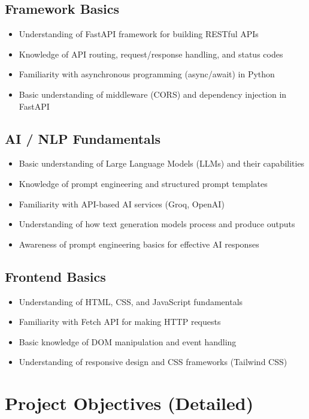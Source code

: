 \documentclass[12pt,a4paper]{article}
\begin{document}
\subsection{Framework Basics}
\begin{itemize}
  \item Understanding of FastAPI framework for building RESTful APIs
  \item Knowledge of API routing, request/response handling, and status codes
  \item Familiarity with asynchronous programming (async/await) in Python
  \item Basic understanding of middleware (CORS) and dependency injection in FastAPI
\end{itemize}

\subsection{AI / NLP Fundamentals}
\begin{itemize}
  \item Basic understanding of Large Language Models (LLMs) and their capabilities
  \item Knowledge of prompt engineering and structured prompt templates
  \item Familiarity with API-based AI services (Groq, OpenAI)
  \item Understanding of how text generation models process and produce outputs
  \item Awareness of prompt engineering basics for effective AI responses
\end{itemize}

\subsection{Frontend Basics}
\begin{itemize}
  \item Understanding of HTML, CSS, and JavaScript fundamentals
  \item Familiarity with Fetch API for making HTTP requests
  \item Basic knowledge of DOM manipulation and event handling
  \item Understanding of responsive design and CSS frameworks (Tailwind CSS)
\end{itemize}


\section{Project Objectives (Detailed)}
\end{document}
